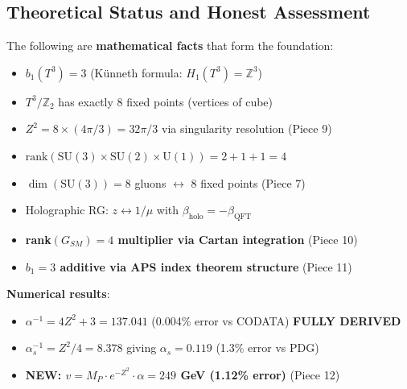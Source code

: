 \documentclass[12pt,a4paper]{article}
\newcommand{\Zsq}{Z^2}
\begin{document}
\subsection{Theoretical Status and Honest Assessment}

\begin{tcolorbox}[colback=green!10!white, colframe=green!60!black, title=What Is Established (v8.6.0)]
The following are \textbf{mathematical facts} that form the foundation:
\begin{itemize}[itemsep=0pt]
    \item[\checkmark] $b_1(T^3) = 3$ (K\"unneth formula: $H_1(T^3) = \mathbb{Z}^3$)
    \item[\checkmark] $T^3/\mathbb{Z}_2$ has exactly 8 fixed points (vertices of cube)
    \item[\checkmark] $\Zsq = 8 \times (4\pi/3) = 32\pi/3$ via singularity resolution (Piece 9)
    \item[\checkmark] $\text{rank}(\text{SU}(3) \times \text{SU}(2) \times \text{U}(1)) = 2 + 1 + 1 = 4$
    \item[\checkmark] $\dim(\text{SU}(3)) = 8$ gluons $\leftrightarrow$ 8 fixed points (Piece 7)
    \item[\checkmark] Holographic RG: $z \leftrightarrow 1/\mu$ with $\beta_{\text{holo}} = -\beta_{\text{QFT}}$
    \item[\checkmark] \textbf{rank$(G_{SM}) = 4$ multiplier via Cartan integration} (Piece 10)
    \item[\checkmark] \textbf{$b_1 = 3$ additive via APS index theorem structure} (Piece 11)
\end{itemize}
\textbf{Numerical results}:
\begin{itemize}[itemsep=0pt]
    \item $\alpha^{-1} = 4\Zsq + 3 = 137.041$ (0.004\% error vs CODATA) \textbf{FULLY DERIVED}
    \item $\alpha_s^{-1} = \Zsq/4 = 8.378$ giving $\alpha_s = 0.119$ (1.3\% error vs PDG)
    \item \textbf{NEW: $v = M_P \cdot e^{-\Zsq} \cdot \alpha = 249$ GeV (1.12\% error)} (Piece 12)
\end{itemize}
\end{tcolorbox}
\end{document}
